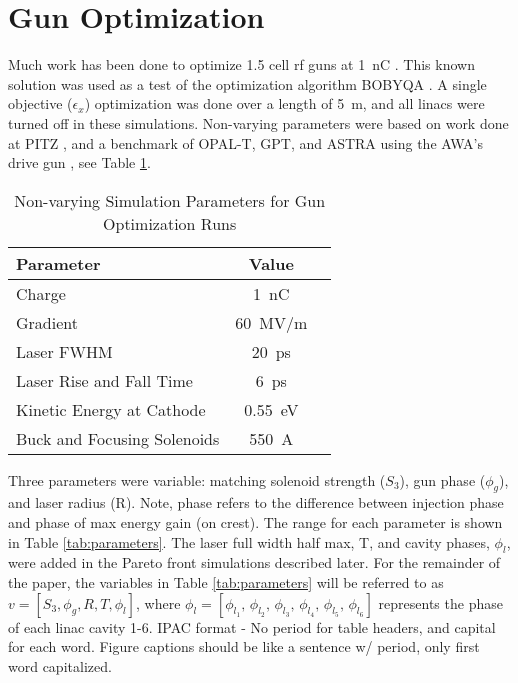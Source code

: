 \documentclass[letterpaper,  %
              ]{jacow}
\newcommand{\nnnote}[1]{\textsf{{\color{blue}{ NN note:}   #1 }}}
\begin{document}
\section{Gun Optimization}
Much work has been done to optimize 1.5 cell rf guns
at \SI{1}{nC} \cite{pitz}. This known solution 
was used as a test 
of the optimization algorithm BOBYQA \cite{bobyqa}. 
A single objective ($\epsilon_x$) optimization was 
done over a length of \SI{5}{m}, 
and all linacs were turned off in these simulations. 
Non-varying parameters were based on work done at 
PITZ \cite{pitz}, and a benchmark of OPAL-T, GPT, and ASTRA 
using the AWA's drive gun \cite{benchmark}, see Table \ref{tab:gun}.
\begin{table}[hbt] %
	\centering
	\begin{tabular}{l c c}
		\textbf{Parameter} & \textbf{Value} \\
		\hline %
		Charge  & \SI{1}{nC} \\
		Gradient & \SI{60}{MV/m} \\
		Laser FWHM & \SI{20}{ps} \\
		Laser Rise and Fall Time & \SI{6}{ps} \\
		Kinetic Energy at Cathode  & \SI{0.55}{eV} \\
		Buck and Focusing Solenoids & \SI{550}{A}
	\end{tabular}
	\caption{Non-varying Simulation Parameters for Gun Optimization Runs}
	\label{tab:gun}
\end{table}
Three parameters were variable: matching solenoid strength ($S_3$), gun phase
($\phi_g$), and laser radius (R). Note, phase 
refers to the difference between injection phase and 
phase of max energy gain (on crest). The range for each 
parameter is shown in Table \ref{tab:parameters}. 
The laser full width half max, T, and cavity phases, $\phi_l$, were added in the 
Pareto front simulations described later. For the 
remainder of the paper, the variables in Table \ref{tab:parameters} 
will be referred to as $v=\left[S_3, \phi_g, R, T, \phi_l\right]$, where 
$\phi_l=[\phi_{l_1},\,\phi_{l_2},\,\phi_{l_3},\,\phi_{l_4},\,\phi_{l_5},\,\phi_{l_6}]$
represents the phase of each linac cavity 1-6. 
\nnnote{IPAC format - No period for table headers, and capital for each word.
Figure captions should be like a sentence w/ period, only first word capitalized.}
\end{document}
